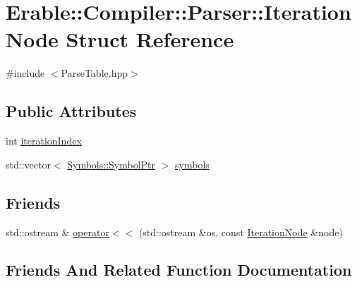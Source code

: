 \hypertarget{struct_erable_1_1_compiler_1_1_parser_1_1_iteration_node}{}\section{Erable\+::Compiler\+::Parser\+::Iteration\+Node Struct Reference}
\label{struct_erable_1_1_compiler_1_1_parser_1_1_iteration_node}


{\ttfamily \#include $<$Parse\+Table.\+hpp$>$}

\subsection*{Public Attributes}
\begin{DoxyCompactItemize}
\item 
int \mbox{\hyperlink{struct_erable_1_1_compiler_1_1_parser_1_1_iteration_node_affbead65ce3682173daa904413ce1b30}{iteration\+Index}}
\item 
std\+::vector$<$ \mbox{\hyperlink{namespace_erable_1_1_compiler_1_1_symbols_a8f0bc762f448ea4d84e8713ab3e140b9}{Symbols\+::\+Symbol\+Ptr}} $>$ \mbox{\hyperlink{struct_erable_1_1_compiler_1_1_parser_1_1_iteration_node_ad0672016683f85369fe2f2776d8808c5}{symbols}}
\end{DoxyCompactItemize}
\subsection*{Friends}
\begin{DoxyCompactItemize}
\item 
std\+::ostream \& \mbox{\hyperlink{struct_erable_1_1_compiler_1_1_parser_1_1_iteration_node_a1d69f19ba201a719f8de8802f8df2f34}{operator$<$$<$}} (std\+::ostream \&os, const \mbox{\hyperlink{struct_erable_1_1_compiler_1_1_parser_1_1_iteration_node}{Iteration\+Node}} \&node)
\end{DoxyCompactItemize}


\subsection{Friends And Related Function Documentation}
\mbox{\label{struct_erable_1_1_compiler_1_1_parser_1_1_iteration_node_a1d69f19ba201a719f8de8802f8df2f34}} 
